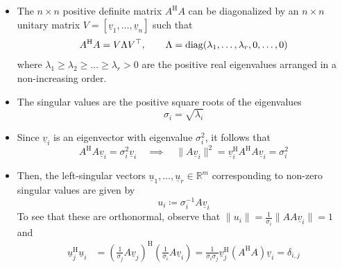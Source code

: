 \documentclass[11pt,twoside]{report}
\newcommand{\bbR}{{\mathbb{R}}}
\newcommand{\vecnot}{\underline}
\newcommand{\Herm}{{\mathrm{H}}}
\begin{document}
\begin{itemize}
\begin{itemize}
\item The $n \times n$ positive definite matrix $A^\Herm A$ can be diagonalized by an $n \times n$ unitary matrix $V = [ \vecnot{v}_1, \dots , \vecnot{v}_n]$ such that 
\[
A^\Herm A  = V \Lambda V^\top , \qquad \Lambda = \diag(\lambda_1, \dots, \lambda_r, 0, \dots, 0)
\]
where $\lambda_1 \ge \lambda_2 \ge \dots \ge \lambda_r > 0$ are the positive real eigenvalues arranged in a non-increasing order. 

\item The singular values are the positive square roots of the eigenvalues
\[
\sigma_i = \sqrt{\lambda_i}
\]


\item  %
Since $\vecnot{v}_i$ is an eigenvector with eigenvalue $\sigma_i^2$, it follows that 
\[
A^\Herm A \vecnot{v}_i = \sigma^2_i \vecnot{v}_i  \quad \implies \quad \|A \vecnot{v}_i\| ^2 = \vecnot{v}_i^\Herm A^\Herm A \vecnot{v}_i = \sigma_i^2
\]

\item Then, the left-singular vectors $\vecnot{u}_1, \dots, \vecnot{u}_r \in \bbR^m$ corresponding to non-zero singular values are given by %
\[
u_i \coloneqq \sigma_i^{-1} A \vecnot{v}_i
\] 
To see that these are orthonormal, observe that $\| u_i\| = \frac{1}{\sigma_i} \| A  A \vecnot{v}_i\| = 1$ and 
%
%
\begin{align*}
\vecnot{u}_j^\Herm \vecnot{u}_i &= \left(\frac{1}{\sigma_j} A \vecnot{v}_j \right)^\Herm \left(\frac{1}{\sigma_i} A \vecnot{v}_i \right) =\frac{1}{\sigma_i \sigma_j} \vecnot{v}_j^\Herm (A^\Herm A) \vecnot{v}_i = \delta_{i,j}  
\end{align*}



\end{itemize}
\end{itemize}
\end{document}
